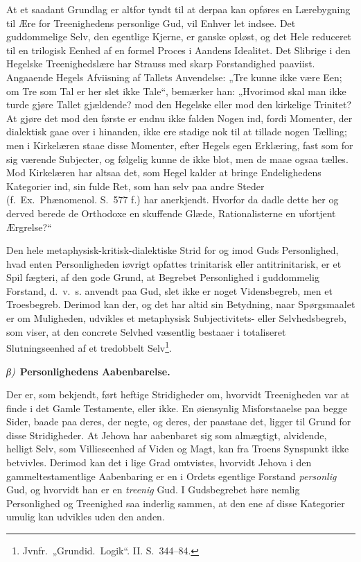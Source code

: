 \documentclass[12pt]{book}
\newcommand{\greekrun}[2]{%
  \medskip\begin{center}{\itshape #1)}\ {\bfseries #2}\end{center}\medskip}
\begin{document}
At et saadant Grundlag er altfor tyndt til at derpaa kan opføres en
Lærebygning til Ære for Treenighedens personlige Gud, vil Enhver let
indsee. Det guddommelige Selv, den egentlige Kjerne, er ganske
opløst, og det Hele reduceret til en trilogisk Eenhed af en formel
Proces i Aandens Idealitet. Det Slibrige i den Hegelske
Treenighedslære har Strauss med skarp Forstandighed paaviist.
Angaaende Hegels Afviisning af Tallets Anvendelse: „Tre kunne ikke
være Een; om Tre som Tal er her slet ikke Tale“, bemærker han:
„Hvorimod skal man ikke turde gjøre Tallet gjældende? mod den
Hegelske eller mod den kirkelige Trinitet? At gjøre det mod den
første er endnu ikke falden Nogen ind, fordi Momenter, der
dialektisk gaae over i hinanden, ikke ere stadige nok til at tillade
nogen Tælling; men i Kirkelæren staae disse Momenter, efter Hegels
egen Erklæring, fast som for sig værende Subjecter, og følgelig
kunne de ikke blot, men de maae ogsaa tælles. Mod Kirkelæren har
altsaa det, som Hegel kalder at bringe Endelighedens Kategorier ind,
sin fulde Ret, som han selv paa andre Steder (f.\ Ex.\ Phænomenol.
S.\ 577 f.) har anerkjendt. Hvorfor da dadle dette her og derved
berede de Orthodoxe en skuffende Glæde, Rationalisterne en ufortjent
Ærgrelse?“

Den hele metaphysisk-kritisk-dialektiske Strid for og imod Guds
Personlighed, hvad enten Personligheden iøvrigt opfattes trinitarisk
eller antitrinitarisk, er et Spil\-
fægteri, af den gode Grund, at Begrebet Personlighed i guddommelig
Forstand, d.\ v.\ s. anvendt paa Gud, slet ikke er noget
Vidensbegreb, men et Troesbegreb. Derimod kan der, og det har altid
sin Betydning, naar Spørgsmaalet er om Muligheden, udvikles et
metaphysisk Subjectivitets- eller Selvhedsbegreb, som viser, at den
concrete Selvhed væsentlig bestaaer i totaliseret Slutningseenhed af
et tredobbelt Selv\footnote{Jvnfr.\ „Grundid.\ Logik“. II.
S.\ 344--84.}.

\greekrun{β}{Personlighedens Aabenbarelse.}

Der er, som bekjendt, ført heftige Stridigheder om, hvorvidt
Treenigheden var at finde i det Gamle Testamente, eller ikke. En
øiensynlig Misforstaaelse paa begge Sider, baade paa deres, der
negte, og deres, der paastaae det, ligger til Grund for disse
Stridigheder. At Jehova har aabenbaret sig som almægtigt, alvidende,
helligt Selv, som Villieseenhed af Viden og Magt, kan fra Troens
Synspunkt ikke betvivles. Derimod kan det i lige Grad omtvistes,
hvorvidt Jehova i den gammeltestamentlige Aabenbaring er en i Ordets
egentlige Forstand \emph{personlig} Gud, og hvorvidt han er en
\emph{treenig} Gud.
I Gudsbegrebet høre nemlig Personlighed og
Treenighed saa inderlig sammen, at den ene af disse Kategorier
umulig kan udvikles uden den anden.
\end{document}

